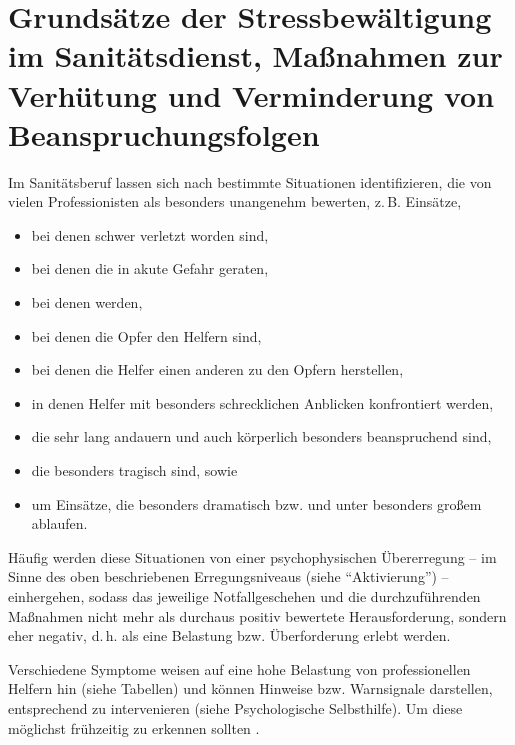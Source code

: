 
\section{Grundsätze der Stressbewältigung im Sanitätsdienst, Maßnahmen zur Verhütung und Verminderung von Beanspruchungsfolgen }


Im Sanitätsberuf lassen sich nach 
bestimmte Situationen identifizieren, die von vielen Professionisten als besonders unangenehm
bewerten, z.\,B. Einsätze,
\begin{itemize}
  \item bei denen  schwer verletzt worden sind,
  \item bei denen die  in akute Gefahr
  geraten,
  \item bei denen 
  werden,
  \item bei denen die Opfer den Helfern  sind,
  \item bei denen die Helfer einen anderen  zu den Opfern herstellen,
  \item in denen Helfer mit besonders schrecklichen
  Anblicken konfrontiert werden,
  \item die sehr lang andauern und auch körperlich besonders
  beanspruchend sind,
  \item die besonders tragisch sind, sowie
  \item um Einsätze, die besonders dramatisch bzw.
   und unter besonders großem 
  ablaufen.
\end{itemize}

Häufig werden diese Situationen von einer psychophysischen
Übererregung -- im Sinne des oben beschriebenen
Erregungsniveaus (siehe \enquote{Aktivierung}) -- einhergehen,
sodass das jeweilige Notfallgeschehen und die durchzuführenden
Maßnahmen nicht mehr als durchaus positiv bewertete
Herausforderung, sondern eher negativ, d.\,h. als eine
Belastung bzw. Überforderung erlebt werden.


{
Verschiedene Symptome weisen auf eine hohe Belastung von
professionellen Helfern hin (siehe Tabellen) und können
Hinweise bzw. Warnsignale darstellen, entsprechend zu
intervenieren (siehe Psychologische Selbsthilfe). Um diese
möglichst frühzeitig zu erkennen sollten
.}
{}
{}
{}
{}





